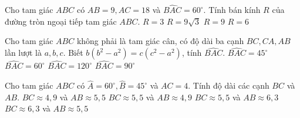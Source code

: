 \begin{ex}%
Cho tam giác $ABC$ có $AB=9, AC=18$ và $\widehat{BAC}=60^\circ$. Tính bán kính $R$ của đường tròn ngoại tiếp tam giác $ABC$.
\choice
{$R=3$}
{$R=9\sqrt{3}$}
{\True $R=9$}
{$R=6$}
\end{ex}
\begin{ex}%
Cho tam giác $ABC$ không phải là tam giác cân, có độ dài ba cạnh $BC, CA, AB$ lần lượt là $a, b, c$. Biết $b(b^2-a^2)=c(c^2-a^2)$, tính $\widehat{BAC}$.
\choice
{$\widehat{BAC}=45^\circ$}
{$\widehat{BAC}=60^\circ$}
{\True $\widehat{BAC}=120^\circ$}
{$\widehat{BAC}=90^\circ$}
\end{ex}

\begin{ex}%
Cho tam giác $ABC$ có $\widehat{A}=60^\circ, \widehat{B}=45^\circ$ và $AC=4$. Tính độ dài các cạnh $BC$ và $AB$.
\choice
{\True $BC\approx 4{,}9$ và $AB\approx 5{,}5$}
{$BC\approx 5{,}5$ và $AB\approx 4{,}9$}
{$BC\approx 5{,}5$ và $AB\approx 6{,}3$}
{$BC\approx 6{,}3$ và $AB\approx 5{,}5$}
\end{ex}

